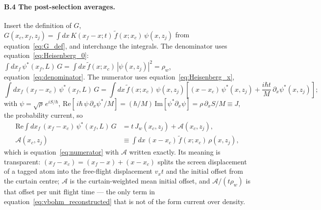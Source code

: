 \documentclass[11pt,a4paper]{article}
\begin{document}
\paragraph{B.4 The post-selection averages.} Insert the definition of $G$, $G(x_c, x_f, z_j) = \int dx\,K(x_f - x; t)\,\tilde{f}(x; x_c)\,\psi(x, z_j)$ from equation~\eqref{eq:G_def}, and interchange the integrals. The denominator uses equation~\eqref{eq:Heisenberg_0}: $\int dx_f\,\psi^*(x_f, L)\,G = \int dx\,\tilde{f}(x; x_c)\,|\psi(x, z_j)|^2 = \rho_w$, equation~\eqref{eq:denominator}. The numerator uses equation~\eqref{eq:Heisenberg_x},
\begin{equation*}
\int dx_f\,(x_f - x_c)\,\psi^*(x_f, L)\,G = \int dx\,\tilde{f}(x; x_c)\,\psi(x, z_j)\left[(x - x_c)\,\psi^*(x, z_j) + \frac{i\hbar t}{M}\,\partial_x\psi^*(x, z_j)\right];
\end{equation*}
with $\psi = \sqrt{\rho}\,e^{iS/\hbar}$, $\mathrm{Re}[\,i\hbar\,\psi\,\partial_x\psi^*/M] = (\hbar/M)\,\mathrm{Im}[\psi^*\partial_x\psi] = \rho\,\partial_x S/M \equiv J$, the probability current, so
\begin{align}
\mathrm{Re}\!\int dx_f\,(x_f - x_c)\,\psi^*(x_f, L)\,G &= t\,J_w(x_c, z_j) + \mathcal{A}(x_c, z_j), \nonumber\\
\mathcal{A}(x_c, z_j) &\equiv \int dx\,(x - x_c)\,\tilde{f}(x; x_c)\,\rho(x, z_j),
\label{eq:B_numerator}
\end{align}
which is equation~\eqref{eq:numerator} with $\mathcal{A}$ written exactly. Its meaning is transparent: $(x_f - x_c) = (x_f - x) + (x - x_c)$ splits the screen displacement of a tagged atom into the free-flight displacement $v_x t$ and the initial offset from the curtain centre; $\mathcal{A}$ is the curtain-weighted mean initial offset, and $\mathcal{A}/(t\rho_w)$ is that offset per unit flight time --- the only term in equation~\eqref{eq:vbohm_reconstructed} that is not of the form current over density.
\end{document}
